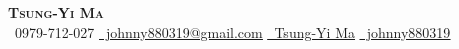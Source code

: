    \textbf{\Huge \scshape Tsung-Yi Ma} \\ \vspace{6pt}
    \small \faPhone \ 0979-712-027 \quad \textbar \quad
    \href{mailto:johnny880319@gmail.com}{\underline{\faEnvelope \ johnny880319@gmail.com}} \quad \textbar \quad
    \href{https://www.linkedin.com/in/tsung-yi-ma-44bb6a268}{\underline{\faLinkedin \ Tsung-Yi Ma}} \quad \textbar \quad
    \href{https://github.com/johnny880319}{\underline{\faGithub \ johnny880319}} \\ \vspace{8pt}
